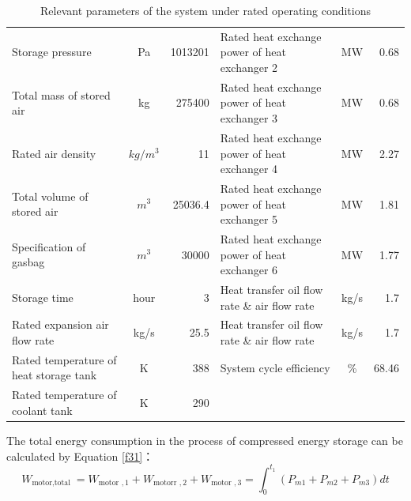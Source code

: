 \documentclass[journal,onecolumn]{IEEEtran}
\begin{document}
\begin{table}[h]
{\begin{tabular}{l|c|r|l|c|r}
		Storage pressure                    & Pa                      & 1013201                    &Rated heat exchange power of heat exchanger 2              & MW                      & 0.68 \\
		Total mass of stored air                 & kg                      & 275400                      &Rated heat exchange power of heat exchanger 3              & MW                      & 0.68\\
		Rated air density                  & $ kg/m^3 $ & 11                         &Rated heat exchange power of heat exchanger 4              & MW                      & 2.27 \\
		Total volume of stored air                 & $ m^3  $   & 25036.4                    &Rated heat exchange power of heat exchanger 5              & MW                      & 1.81 \\
		Specification of gasbag                   & $ m^3 $    & 30000                      &Rated heat exchange power of heat exchanger 6              & MW                      & 1.77  \\
		Storage time                   & hour                      & 3                          &Heat transfer oil flow rate \& air flow rate          & kg/s                    & 1.7  \\
		Rated expansion air flow rate                & kg/s                    & 25.5                        &Heat transfer oil flow rate \& air flow rate           & kg/s                    & 1.7  \\
		Rated temperature of heat storage tank                 & K                       & 388                         &System cycle efficiency                  & \%                      & 68.46\\
		Rated temperature of coolant tank                 & K                       & 290                         
		                      
	\end{tabular}
}
	\caption{Relevant parameters of the system under rated operating conditions}
	\label{tab:my-table}
\end{table}

The total energy consumption in the process of compressed energy storage can be calculated by Equation \ref{f31}：
\begin{equation}\label{f31}
	W_{\text {motor,total }}=W_{\text {motor }, 1}+W_{\text {motorr }, 2}+W_{\text {motor }, 3}=\int_{0}^{t_{1}}\left(P_{m 1}+P_{m 2}+P_{m 3}\right) d t
\end{equation}
\end{document}
